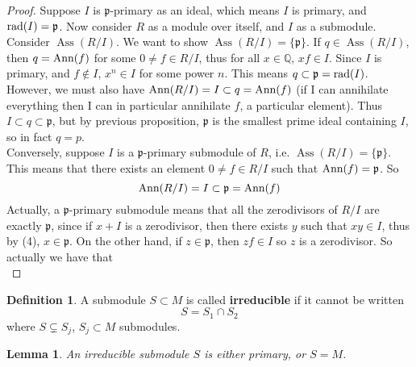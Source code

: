 \documentclass[12pt]{article}
\newcommand{\q}{\mathbb{Q}}
\newcommand{\rad}{\textup{rad}}
\newcommand{\ann}[1]{\textup{Ann}(#1)}
\DeclareMathOperator{\Ass}{Ass}
\def\p{\mathfrak{p}}
\newtheorem{lemma}[theorem]{Lemma}
\theoremstyle{definition}
\newtheorem{definition}[theorem]{Definition}
\begin{document}
\begin{proof}
Suppose $I$ is $\p$-primary as an ideal, which means $I$ is primary, and $\rad (I) = \p$. Now consider $R$ as a module over itself, and $I$ as a submodule. Consider $\Ass(R/I)$. We want to show $\Ass (R/I) =\{\p\}$. If $q\in \Ass (R/I)$, then $q = \ann{f}$ for some $0\neq f\in R/I$, thus for all $x\in \q$, $xf\in I$. Since $I$ is primary, and $f\notin I$, $x^n\in I$ for some power $n$. This means $q\subset \p = \rad(I)$. However, we must also have $\ann{R/I} = I \subset q = \ann{f}$ (if I can annihilate everything then I can in particular annihilate $f$, a particular element). Thus $I\subset q \subset \p$, but by previous proposition, $\p$ is the smallest prime ideal containing $I$, so in fact $q=p$.\\
Conversely, suppose $I$ is a $\p$-primary submodule of $R$, i.e. $\Ass (R/I) = \{\p\}$. This means that there exists an element $0\neq f\in R/I$ such that $\ann{f} = \p$. So 
\begin{equation}
    \ann{R/I} = I \subset \p = \ann{f}
\end{equation}
Actually, a $\p$-primary submodule means that all the zerodivisors of $R/I$ are exactly $\p$, since if $x+I$ is a zerodivisor, then there exists $y$ such that $xy \in I$, thus by (4), $x\in \p$. On the other hand, if $z\in \p$, then $zf \in I$ so $z$ is a zerodivisor. So actually we have that
\begin{equation}
    
\end{equation}
\end{proof}
\begin{definition}
A submodule $S\subset M$ is called \textbf{irreducible} if it cannot be written 
\[
S = S_1 \cap S_2
\]
where $S \subsetneq S_j $, $S_j \subset M$ submodules.
\end{definition}
\begin{lemma}
An irreducible submodule $S$ is either primary, or $S = M$.
\end{lemma}
\end{document}
